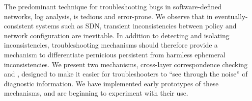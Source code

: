 The predominant technique for troubleshooting bugs in software-defined networks,
log analysis, is tedious and error-prone. We observe that
in eventually-consistent systems such as SDN,
transient inconsistencies between policy and network configuration are inevitable.
In addition to detecting and isolating inconsistencies,
troubleshooting mechanisms should therefore provide a mechanism to differentiate
pernicious persistent from harmless ephemeral inconsistencies. We present two
mechanisms, cross-layer correspondence checking and \simulator,
designed to make it easier for troubleshooters to ``see through the noise'' of
diagnostic information. We have implemented early prototypes of these
mechanisms, and are beginning to experiment with their use.
